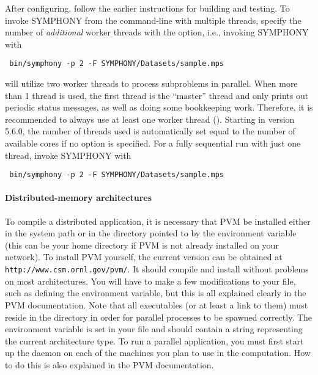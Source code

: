After configuring, follow the earlier instructions for building and testing.
To invoke SYMPHONY from the command-line with multiple threads, specify the
number of \emph{additional} worker threads with the  option, i.e., 
invoking SYMPHONY with
{\color{Brown}
\begin{verbatim}
 bin/symphony -p 2 -F SYMPHONY/Datasets/sample.mps
\end{verbatim}
}
will utilize two worker threads to process subproblems in parallel. 
When more than 1 thread is used, the first thread is the ``master''
thread and only prints out periodic status messages, as well as doing some
bookkeeping work. Therefore, it is recommended to always use at least one
worker thread (). Starting in version 5.6.0, the number of
threads used is automatically set equal to the number of available cores if no
option is specified. For a fully sequential run with just one thread, invoke
SYMPHONY with
{\color{Brown}
\begin{verbatim}
 bin/symphony -p 2 -F SYMPHONY/Datasets/sample.mps
\end{verbatim}
}

\paragraph{Distributed-memory architectures}
\label{distributed-build}

\label{PVM}
To compile a distributed application, it is necessary that PVM be installed
either in the system path or in the directory pointed to by the environment
variable  (this can be your home directory if PVM is not
already installed on your network). To install PVM yourself, the current
version can be obtained at \texttt{
{http://www.csm.ornl.gov/pvm/}}. It should compile and install without
problems on most architectures. You will have to make a few modifications to
your  file, such as defining the  environment
variable, but this is all explained clearly in the PVM documentation. Note
that all executables (or at least a link to them) must reside in the
 directory in order for parallel processes
to be spawned correctly. The environment variable  is set in
your  file and should contain a string representing the current
architecture type. To run a parallel application, you must first start up the
daemon on each of the machines you plan to use in the computation. How to do
this is also explained in the PVM documentation.

